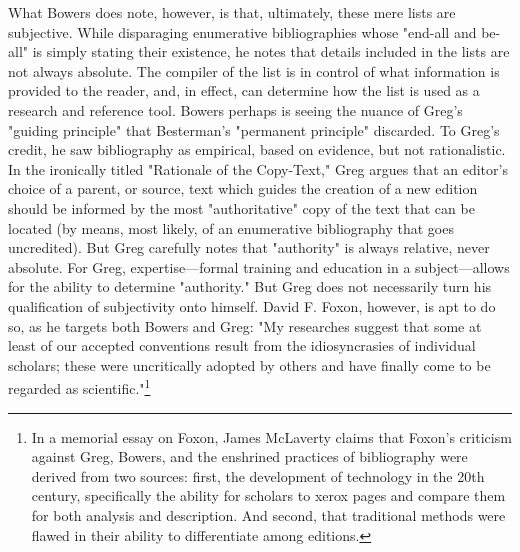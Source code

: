 What Bowers does note, however, is that, ultimately, these mere lists are subjective. While disparaging enumerative bibliographies whose "end-all and be-all" is simply stating their existence, he notes that details included in the lists are not always absolute. The compiler of the list is in control of what information is provided to the reader, and, in effect, can determine how the list is used as a research and reference tool. Bowers perhaps is seeing the nuance of Greg's "guiding principle" that Besterman's "permanent principle" discarded. To Greg's credit, he saw bibliography as empirical, based on evidence, but not rationalistic. In the ironically titled "Rationale of the Copy-Text," Greg argues that an editor's choice of a parent, or source, text which guides the creation of a new edition should be informed by the most "authoritative" copy of the text that can be located (by means, most likely, of an enumerative bibliography that goes uncredited). But Greg carefully notes that "authority" is always relative, never absolute. \autocite{greg_rationale_1950} For Greg, expertise---formal training and education in a subject---allows for the ability to determine "authority." But Greg does not necessarily turn his qualification of subjectivity onto himself. David F. Foxon, however, is apt to do so, as he targets both Bowers and Greg: "My researches suggest that some at least of our accepted conventions result from the idiosyncrasies of individual scholars; these were uncritically adopted by others and have finally come to be regarded as scientific."\footnote{\autocite[7]{david_f._foxon_thoughts_1970} In a memorial essay on Foxon, James McLaverty claims that Foxon's criticism against Greg, Bowers, and the enshrined practices of bibliography were derived from two sources: first, the development of technology in the 20th century, specifically the ability for scholars to xerox pages and compare them for both analysis and description. And second, that traditional methods were flawed in their ability to differentiate among editions.\autocite[103]{mclaverty_david_2001}}

